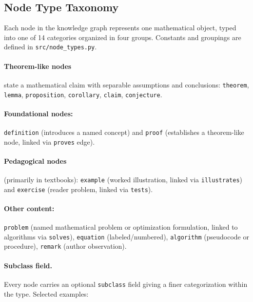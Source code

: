 
\subsection{Node Type Taxonomy}
\label{app:node-types}

Each node in the knowledge graph represents one mathematical object, typed
into one of 14 categories organized in four groups. Constants and groupings
are defined in \texttt{src/node\_types.py}.

\paragraph{Theorem-like nodes} state a mathematical claim with separable
assumptions and conclusions: \texttt{theorem}, \texttt{lemma},
\texttt{proposition}, \texttt{corollary}, \texttt{claim}, \texttt{conjecture}.

\paragraph{Foundational nodes:} \texttt{definition} (introduces a named
concept) and \texttt{proof} (establishes a theorem-like node, linked via
\texttt{proves} edge).

\paragraph{Pedagogical nodes} (primarily in textbooks): \texttt{example}
(worked illustration, linked via \texttt{illustrates}) and \texttt{exercise}
(reader problem, linked via \texttt{tests}).

\paragraph{Other content:} \texttt{problem} (named mathematical problem or
optimization formulation, linked to algorithms via \texttt{solves}),
\texttt{equation} (labeled/numbered), \texttt{algorithm} (pseudocode or
procedure), \texttt{remark} (author observation).

\paragraph{Subclass field.}
Every node carries an optional \texttt{subclass} field giving a finer
categorization within the type. Selected examples:

